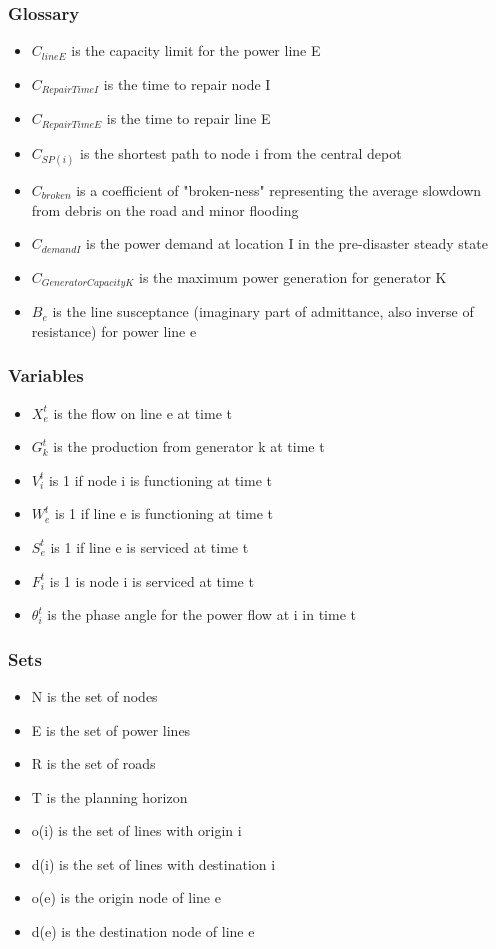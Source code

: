 \documentclass{article}
\begin{document}
	\subsubsection{Glossary}
	\begin{itemize}
		\item $C_{lineE}$ is the capacity limit for the power line E
		\item $C_{RepairTimeI}$ is the time to repair node I
		\item $C_{RepairTimeE}$ is the time to repair line E
		\item $C_{SP(i)}$ is the shortest path to node i from the central depot
		\item $C_{broken}$ is a coefficient of "broken-ness" representing the average slowdown from debris on the road and minor flooding
		\item $C_{demandI}$ is the power demand at location I in the pre-disaster steady state
		\item $C_{GeneratorCapacityK}$ is the maximum power generation for generator K
		\item $B_e$ is the line susceptance (imaginary part of admittance, also inverse of resistance) for power line e
	\end{itemize}
	\subsubsection{Variables}
	\begin{itemize}
		
		\item $X_{e}^{t}$ is the flow on line e at time t
		\item $G_{k}^t$ is the production from generator k at time t
		\item $V_i^t$ is 1 if node i is functioning at time t
		\item $W_{e}^t$ is 1 if line e is functioning at time t
		\item $S_{e}^t$ is 1 if line e is serviced at time t
		\item $F_i^t$ is 1 is node i is serviced at time t 
		\item $\theta_i^t$ is the phase angle for the power flow at i in time t
		
	\end{itemize}
	\subsubsection{Sets}
	\begin{itemize}
		\item N is the set of nodes
		\item E is the set of power lines
		\item R is the set of roads
		\item T is the planning horizon
		\item o(i) is the set of lines with origin i
		\item d(i) is the set of lines with destination i
		\item o(e) is the origin node of line e
		\item d(e) is the destination node of line e
	\end{itemize}
\end{document}
